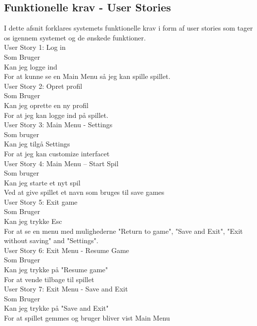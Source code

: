 \subsection{Funktionelle krav - User Stories}
I dette afsnit forklares systemets funktionelle krav i form af user stories som tager os igennem systemet og de ønskede funktioner. \\
 
User Story 1: Log in \\
  Som Bruger \\
  Kan jeg logge ind \\
  For at kunne se en Main Menu så jeg kan spille spillet. \\
  
User Story 2: Opret profil \\
  Som Bruger \\
  Kan jeg oprette en ny profil \\
  For at jeg kan logge ind på spillet. \\

User Story 3: Main Menu - Settings \\
  Som bruger \\
  Kan jeg tilgå Settings \\
  For at jeg kan customize interfacet \\

User Story 4: Main Menu -- Start Spil \\
  Som bruger \\
  Kan jeg starte et nyt spil \\ 
  Ved at give spillet et navn som bruges til save games \\

User Story 5: Exit game \\
  Som Bruger \\ 
  Kan jeg trykke Esc \\
  For at se en menu med mulighederne "Return to game", "Save and Exit", "Exit without saving" and "Settings". \\

User Story 6: Exit Menu - Resume Game\\
  Som Bruger \\
  Kan jeg trykke på "Resume game" \\
  For at vende tilbage til spillet\\

User Story 7: Exit Menu - Save and Exit\\
  Som Bruger \\
  Kan jeg trykke på "Save and Exit" \\
  For at spillet gemmes og bruger bliver vist Main Menu\\

